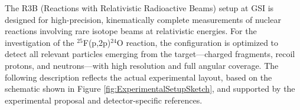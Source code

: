 
The \gls{R3B} (Reactions with Relativistic Radioactive Beams) setup at GSI is designed for high-precision, kinematically complete measurements of nuclear reactions involving rare isotope beams at relativistic energies. For the investigation of the $^{25}$F(p,2p)$^{24}$O reaction, the configuration is optimized to detect all relevant particles emerging from the target—charged fragments, recoil protons, and neutrons—with high resolution and full angular coverage. The following description reflects the actual experimental layout, based on the schematic shown in Figure \ref{fig:ExperimentalSetupSketch}, and supported by the experimental proposal and detector-specific references.





	

